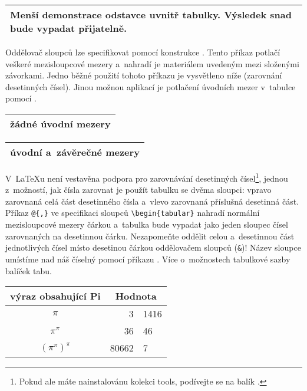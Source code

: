 \begin{example}
\begin{tabular}{|p{4.7cm}|}
\hline
Menší demonstrace odstavce
uvnitř tabulky. Výsledek snad
bude vypadat přijatelně.\\
\hline 
\end{tabular}
\end{example}

Oddělovač sloupců lze specifikovat pomocí konstrukce .
Tento příkaz potlačí veškeré mezisloupcové mezery a~nahradí je
materiálem uvedeným mezi složenými závorkami. Jedno běžné použití
tohoto příkazu je vysvětleno níže (zarovnání desetinných čísel).
Jinou možnou aplikací je potlačení úvodních mezer v~tabulce pomocí
.

\begin{example}
\begin{tabular}{@{} l @{}}
\hline 
žádné úvodní mezery\\
\hline
\end{tabular}
\end{example}

\begin{example}
\begin{tabular}{l}
\hline
úvodní a~závěrečné mezery\\
\hline
\end{tabular}
\end{example}

%
%

 V~\LaTeX u není vestavěna
podpora pro zarovnávání desetinných čísel\footnote{Pokud ale máte nainstalovánu
kolekci \textsf{tools}, podívejte se na balík .},
jednou z~možností, jak čísla zarovnat je použít tabulku se dvěma sloupci:
vpravo zarovnaná celá část desetinného čísla a~vlevo zarovnaná příslušná
desetinná část. Příkaz \verb|@{,}|
ve specifikaci sloupců \verb|\begin{tabular}| nahradí normální mezisloupcové
mezery čárkou a~tabulka bude vypadat jako jeden sloupec čísel zarovnaných
na desetinnou čárku. Nezapomeňte oddělit celou a~desetinnou část jednotlivých
čísel místo desetinou čárkou oddělovačem sloupců (\verb|&|)! Název sloupce umístíme
nad náš číselný  pomocí příkazu . Více o~možnostech tabulkové sazby balíček \textsf{tabu}.
 
\begin{example}
\begin{tabular}{c r @{,} l}
výraz obsahující Pi &
\multicolumn{2}{c}{Hodnota} \\
\hline
$\pi$               & 3&1416  \\
$\pi^{\pi}$         & 36&46   \\
$(\pi^{\pi})^{\pi}$ & 80662&7 \\
\end{tabular}
\end{example}

